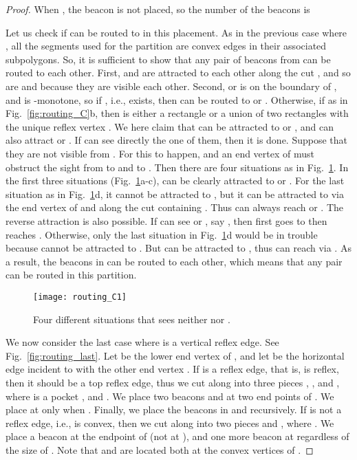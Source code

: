 \documentclass[11pt]{article}
\theoremstyle{definition}
\begin{document}
\begin{proof}
When , the beacon  is not placed, so the number of the beacons is


Let us check if  can be routed to  in this placement. As in the previous case where , all the segments used for the partition are convex edges in their associated subpolygons. So, it is sufficient to show that any pair of beacons from  can be routed to each other. First,  and  are attracted to each other along the cut , and so are  and  because they are visible each other. Second,  or  is on the boundary of , and  is -monotone, so if , i.e.,  exists, then  can be routed to  or . Otherwise, if  as in Fig.~\ref{fig:routing_C}b, then  is either a rectangle or a union of two rectangles with the unique reflex vertex . We here claim that  can be attracted to  or , and  can also attract  or . If  can see directly the one of them, then it is done. Suppose that they are not visible from . For this to happen,  and an end vertex of  must obstruct the sight from  to  and to . Then there are four situations as in Fig.~\ref{fig:routing_C1}. In the first three situations (Fig.~\ref{fig:routing_C1}a-c),  can be clearly attracted to  or . For the last situation as in Fig.~\ref{fig:routing_C1}d, it cannot be attracted to , but it can be attracted to  via the end vertex of  and along the cut containing . Thus  can always reach  or . The reverse attraction is also possible. If  can see  or , say , then  first goes to  then reaches . Otherwise, only the last situation in Fig.~\ref{fig:routing_C1}d would be in trouble because  cannot be attracted to . But  can be attracted to , thus  can reach  via . As a result, the beacons in  can be routed to each other, which means that any pair  can be routed in this partition.

\begin{figure}[tb]
\centering
\texttt{[image: routing\_C1]}
\caption{Four different situations that  sees neither  nor .}
\label{fig:routing_C1}
\end{figure}

We now consider the last case where  is a vertical reflex edge. See Fig.~\ref{fig:routing_last}. Let  be the lower end vertex of , and let  be the horizontal edge incident to  with the other end vertex . If  is a reflex edge, that is,  is reflex, then it should be a top reflex edge, thus we cut  along  into three pieces , , and , where  is a pocket , and . We place two beacons  and  at two end points of . We place  at  only when . Finally, we place the beacons in  and  recursively. If  is not a reflex edge, i.e.,  is convex, then we cut  along  into two pieces  and , where . We place a beacon  at the endpoint of  (not at ), and one more beacon  at  regardless of the size of . Note that  and  are located both at the convex vertices of .


\end{proof}
\end{document}
